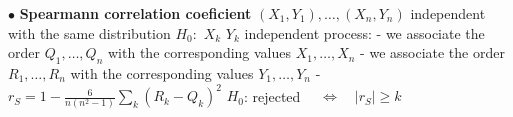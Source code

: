 \documentclass[twoside]{book}
\begin{document}
\pagestyle{empty}

\def\dr #1{\par\noindent $\bullet$ {\bf #1}}


\dr{Spearmann correlation coeficient}
\newline $(X_{1},Y_{1}),\dots,(X_{n},Y_{n})$  independent with the same distribution
\newline $H_0:$ $X_k$ $Y_k$ independent
\newline
process:
\newline - we associate the order $Q_1,\dots, Q_n$ with the corresponding values $X_1,\dots, X_n$
\newline - we associate the order $R_1,\dots, R_n$ with the corresponding values $Y_1,\dots, Y_n$
\newline - $\displaystyle{ r_S=1-\frac6{n(n^2-1)}\sum_k (R_k-Q_k)^2} $
\newline $H_0$:  rejected $\quad\Longleftrightarrow\quad |r_S| \geq k$
\end{document}
